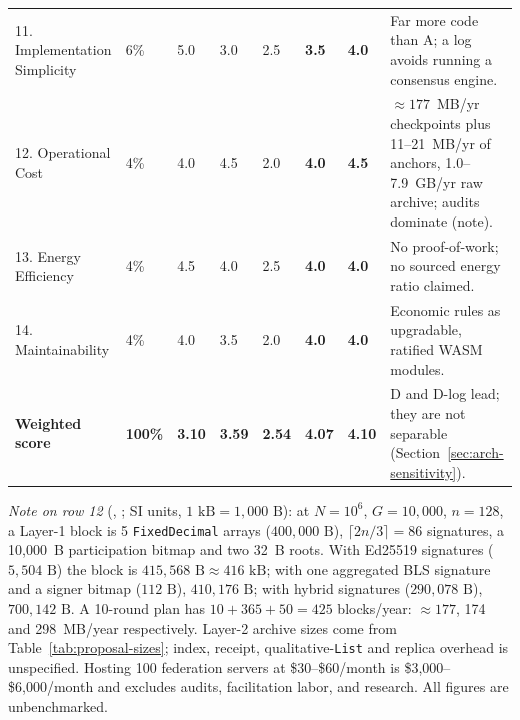 \documentclass[10pt,twoside,openany]{book}
\theoremstyle{dpepstyle}
\begin{document}
\begin{table}[htbp]
\begin{tabularx}{\textwidth}{L{0.92in} C{0.22in} C{0.20in} C{0.20in} C{0.20in} C{0.22in} C{0.30in} Y}
11. Implementation Simplicity & 6\% & 5.0 & 3.0 & 2.5 & \textbf{3.5} & \textbf{4.0} & Far more code than A; a log avoids running a consensus engine. \\
12. Operational Cost & 4\% & 4.0 & 4.5 & 2.0 & \textbf{4.0} & \textbf{4.5} & $\approx 177$~MB/yr checkpoints plus 11--21~MB/yr of anchors, 1.0--7.9~GB/yr raw archive; audits dominate (note). \\
13. Energy Efficiency & 4\% & 4.5 & 4.0 & 2.5 & \textbf{4.0} & \textbf{4.0} & No proof-of-work; no sourced energy ratio claimed. \\
14. Maintainability & 4\% & 4.0 & 3.5 & 2.0 & \textbf{4.0} & \textbf{4.0} & Economic rules as upgradable, ratified WASM modules. \\
\midrule
\textbf{Weighted score} & \textbf{100\%} & \textbf{3.10} & \textbf{3.59} & \textbf{2.54} & \textbf{4.07} & \textbf{4.10} & D and D-log lead; they are not separable (Section~\ref{sec:arch-sensitivity}). \\
\bottomrule
\end{tabularx}
\par\smallskip
{\scriptsize\raggedright \emph{Note on row 12} (, ; SI units, $1\text{ kB}=1{,}000\text{ B}$): at $N=10^6$, $G=10{,}000$, $n=128$, a Layer-1 block is 5 \texttt{FixedDecimal} arrays ($400{,}000\text{ B}$), $\lceil 2n/3\rceil = 86$ signatures, a 10{,}000~B participation bitmap and two 32~B roots. With Ed25519 signatures ($5{,}504\text{ B}$) the block is $415{,}568\text{ B} \approx 416\text{ kB}$; with one aggregated BLS signature and a signer bitmap ($112\text{ B}$), $410{,}176\text{ B}$; with hybrid signatures ($290{,}078\text{ B}$), $700{,}142\text{ B}$. A 10-round plan has $10+365+50=425$ blocks/year: $\approx 177$, 174 and 298~MB/year respectively. Layer-2 archive sizes come from Table~\ref{tab:proposal-sizes}; index, receipt, qualitative-\texttt{List} and replica overhead is unspecified. Hosting 100 federation servers at \$30--\$60/month is \$3,000--\$6,000/month and excludes audits, facilitation labor, and research. All figures are unbenchmarked.\par}
\end{table}

\FloatBarrier
\end{document}
